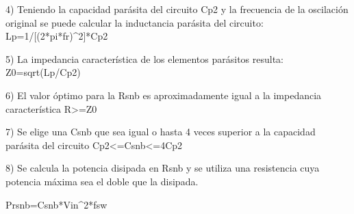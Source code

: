 4) Teniendo la capacidad parásita del circuito Cp2 y la frecuencia de la oscilación original se puede calcular la inductancia parásita del circuito:
Lp=1/{[(2*pi*fr)^2]*Cp2}

5) La impedancia característica de los elementos parásitos resulta:
Z0=sqrt(Lp/Cp2)

6) El valor óptimo para la Rsnb es aproximadamente igual a la impedancia característica
R>=Z0

7) Se elige una Csnb que sea igual o hasta 4 veces superior a la capacidad parásita del circuito 
Cp2<=Csnb<=4Cp2

8) Se calcula la potencia disipada en Rsnb y se utiliza una resistencia cuya potencia máxima sea el doble que la disipada. 

Prsnb=Csnb*Vin^2*fsw